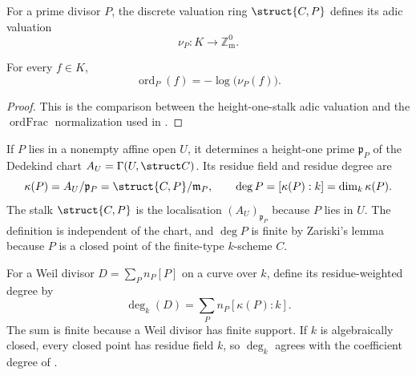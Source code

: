 \begin{definition}
  \label{def:adelic_pointValuation}
  \leanok

  For a prime divisor \(P\), the discrete valuation ring
  \(\struct{C,P}\) defines its adic valuation
  \[
    \nu_P\colon K\longrightarrow\mathbb Z_{\mathrm m}^{0}.
  \]
\end{definition}

\begin{lemma}
  \label{lem:adelic_order_eq_neg_log_pointValuation}
  \leanok

  For every \(f\in K\),
  \[
    \operatorname{ord}_P(f)=-\log\bigl(\nu_P(f)\bigr).
  \]
\end{lemma}
\begin{proof}
  \leanok
  This is the comparison between the height-one-stalk adic valuation and the
  \(\operatorname{ordFrac}\) normalization used in
  .
\end{proof}

\begin{definition}
  \label{def:adelic_residue_degree}

  If \(P\) lies in a nonempty affine open \(U\), it determines a height-one
  prime \(\mathfrak p_P\) of the Dedekind chart
  \(A_U=\Gamma(U,\struct C)\).  Its residue field and residue degree are
  \[
    \kappa(P)=A_U/\mathfrak p_P
      =\struct{C,P}/\mathfrak m_P,
    \qquad
    \deg P=[\kappa(P):k]=\dim_k\kappa(P).
  \]
  The stalk \(\struct{C, P}\) is the localisation \((A_U)_{\mathfrak p_P}\)
  because \(P\) lies in \(U\).  The definition is independent of the chart,
  and \(\deg P\) is finite by Zariski's lemma because \(P\) is a closed point
  of the finite-type \(k\)-scheme \(C\).
\end{definition}

\begin{definition}
  \label{def:adelic_divisor_degree}

  For a Weil divisor \(D=\sum_P n_P[P]\) on a curve over \(k\), define its
  residue-weighted degree by
  \[
    \deg_k(D)=\sum_P n_P[\kappa(P):k].
  \]
  The sum is finite because a Weil divisor has finite support.  If \(k\) is
  algebraically closed, every closed point has residue field \(k\), so
  \(\deg_k\) agrees with the coefficient degree of
  .
\end{definition}

